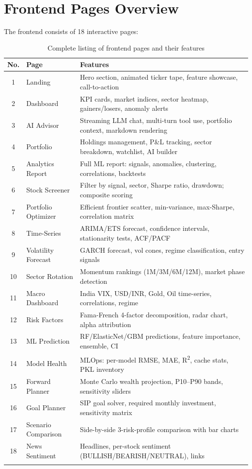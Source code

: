\documentclass[12pt, a4paper, oneside]{report}
\begin{document}
\section{Frontend Pages Overview}
\label{sec:frontend_pages}

The frontend consists of 18 interactive pages:

\begin{longtable}{@{}c p{3.5cm} p{8.5cm}@{}}
\toprule
\textbf{No.} & \textbf{Page} & \textbf{Features} \\
\midrule
\endhead
1 & Landing & Hero section, animated ticker tape, feature showcase, call-to-action \\
2 & Dashboard & KPI cards, market indices, sector heatmap, gainers/losers, anomaly alerts \\
3 & AI Advisor & Streaming LLM chat, multi-turn tool use, portfolio context, markdown rendering \\
4 & Portfolio & Holdings management, P\&L tracking, sector breakdown, watchlist, AI builder \\
5 & Analytics Report & Full ML report: signals, anomalies, clustering, correlations, backtests \\
6 & Stock Screener & Filter by signal, sector, Sharpe ratio, drawdown; composite scoring \\
7 & Portfolio Optimizer & Efficient frontier scatter, min-variance, max-Sharpe, correlation matrix \\
8 & Time-Series & ARIMA/ETS forecast, confidence intervals, stationarity tests, ACF/PACF \\
9 & Volatility Forecast & GARCH forecast, vol cones, regime classification, entry signals \\
10 & Sector Rotation & Momentum rankings (1M/3M/6M/12M), market phase detection \\
11 & Macro Dashboard & India VIX, USD/INR, Gold, Oil time-series, correlations, regime \\
12 & Risk Factors & Fama-French 4-factor decomposition, radar chart, alpha attribution \\
13 & ML Prediction & RF/ElasticNet/GBM predictions, feature importance, ensemble, CI \\
14 & Model Health & MLOps: per-model RMSE, MAE, R\textsuperscript{2}, cache stats, PKL inventory \\
15 & Forward Planner & Monte Carlo wealth projection, P10--P90 bands, sensitivity sliders \\
16 & Goal Planner & SIP goal solver, required monthly investment, sensitivity matrix \\
17 & Scenario Comparison & Side-by-side 3-risk-profile comparison with bar charts \\
18 & News Sentiment & Headlines, per-stock sentiment (BULLISH/BEARISH/NEUTRAL), links \\
\bottomrule
\caption{Complete listing of frontend pages and their features}
\label{tab:frontend_pages}
\end{longtable}
\end{document}
